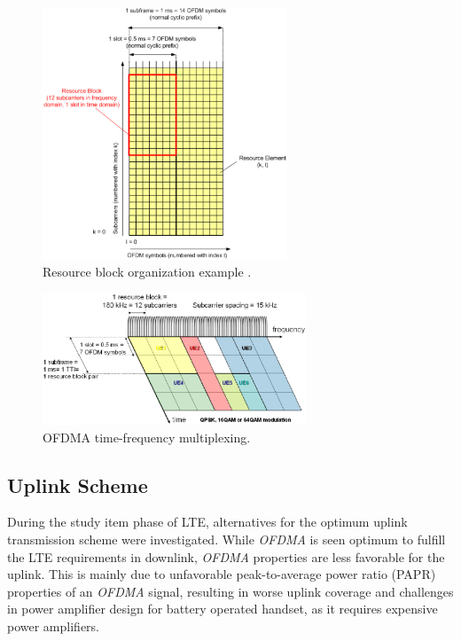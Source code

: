 \begin{figure}[htbp]
    \centering
    \includegraphics[width=0.65\textwidth]{./figures/ofdm_resource_block}
    \caption{ Resource block organization example \cite{umtslte}.
    \label{fig:ofdmresblk}}
\end{figure}


\begin{figure}[htbp]
    \centering
    \includegraphics[width=0.70\textwidth]{./figures/downlink_channels}
    \caption{ OFDMA time-frequency multiplexing.
    \label{fig:dlchann}}
\end{figure}


\subsection{Uplink Scheme}%

 During the study item phase of LTE, alternatives for the optimum uplink
transmission scheme were investigated. While \textit{OFDMA} is seen optimum to fulfill
the LTE requirements in downlink, \textit{OFDMA} properties are less favorable for the
uplink. This is mainly due to unfavorable peak-to-average power ratio (PAPR)
properties of an \textit{OFDMA} signal, resulting in worse uplink coverage and
challenges in power amplifier design for battery operated handset, as it
requires expensive power amplifiers.

